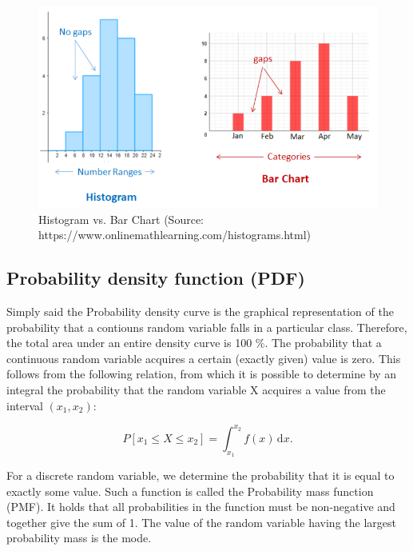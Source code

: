 \documentclass[a4paper,10pt,twoside]{article}
\begin{document}
\vspace{0.3cm}
\begin{figure}[hbt!] 
\begin{center}
\includegraphics[width=12cm]{../pictures/histogram_barchart.png} 
\caption[Histogram vs. Bar Chart (boxplot)]{Histogram vs. Bar Chart (Source: https://www.onlinemathlearning.com/histograms.html)}
\label{fig:histogram_barchart}
\end{center}
\end{figure}

\subsection{Probability density function (PDF)}

Simply said the Probability density curve is the graphical representation of the probability that a contiouns random variable falls in a particular class. Therefore, the total area under an entire density curve is 100 \%. The probability that a continuous random variable acquires a certain (exactly given) value is zero. This follows from the following relation, from which it is possible to determine by an integral the probability that the random variable X acquires a value from the interval $ (x_1, x_2) $:

$$
P[x_1 \leq X \leq x_2] = \int_{x_1}^{x_2} f(x)\, \mathrm{d}x.
$$

\noindent For a discrete random variable, we determine the probability that it is equal to exactly some value. Such a function is called the Probability mass function (PMF). It holds that all probabilities in the function must be non-negative and together give the sum of 1. The value of the random variable having the largest probability mass is the mode.

\newpage
\vspace*{-1cm}
\end{document}
